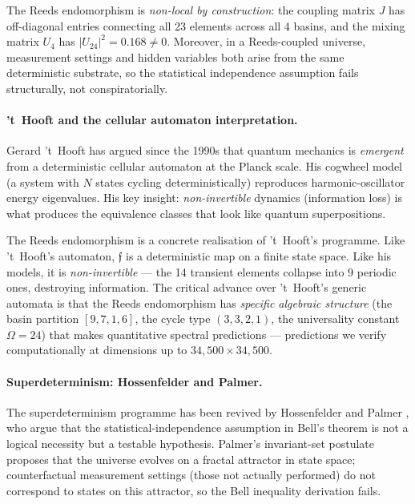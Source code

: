 \documentclass[12pt,a4paper]{article}
\theoremstyle{definition}
\theoremstyle{remark}
\newcommand{\Reeds}{\mathfrak{f}}
\newcommand{\Umix}{U_4}
\newcommand{\Jcoup}{J}
\begin{document}
The Reeds endomorphism is \emph{non-local by construction}: the coupling matrix
$\Jcoup$ has off-diagonal entries connecting all 23 elements across all 4 basins,
and the mixing matrix $\Umix$ has $|U_{24}|^2 = 0.168 \neq 0$. Moreover, in a
Reeds-coupled universe, measurement settings and hidden variables both arise from
the same deterministic substrate, so the statistical independence assumption
fails structurally, not conspiratorially.

\paragraph{'t~Hooft and the cellular automaton interpretation.}
Gerard 't~Hooft \cite{thooft2016, thooft2005, thooft2021} has argued since the
1990s that quantum mechanics is \emph{emergent} from a deterministic cellular
automaton at the Planck scale. His cogwheel model (a system with $N$ states
cycling deterministically) reproduces harmonic-oscillator energy eigenvalues. His
key insight: \emph{non-invertible} dynamics (information loss) is what produces
the equivalence classes that look like quantum superpositions.

The Reeds endomorphism is a concrete realisation of 't~Hooft's programme. Like
't~Hooft's automaton, $\Reeds$ is a deterministic map on a finite state space.
Like his models, it is \emph{non-invertible} --- the 14 transient elements
collapse into 9 periodic ones, destroying information. The critical advance over
't~Hooft's generic automata is that the Reeds endomorphism has \emph{specific
algebraic structure} (the basin partition $[9,7,1,6]$, the cycle type $(3,3,2,1)$,
the universality constant $\Omega = 24$) that makes quantitative spectral
predictions --- predictions we verify computationally at dimensions up to
$34{,}500 \times 34{,}500$.

\paragraph{Superdeterminism: Hossenfelder and Palmer.}
The superdeterminism programme has been revived by Hossenfelder and Palmer
\cite{hossenfelder2020, hossenfelder_guide2020}, who argue that the
statistical-independence assumption in Bell's theorem is not a logical necessity
but a testable hypothesis. Palmer's invariant-set postulate \cite{palmer2020,
palmer2009} proposes that the universe evolves on a fractal attractor in state
space; counterfactual measurement settings (those not actually performed) do not
correspond to states on this attractor, so the Bell inequality derivation fails.
\end{document}
